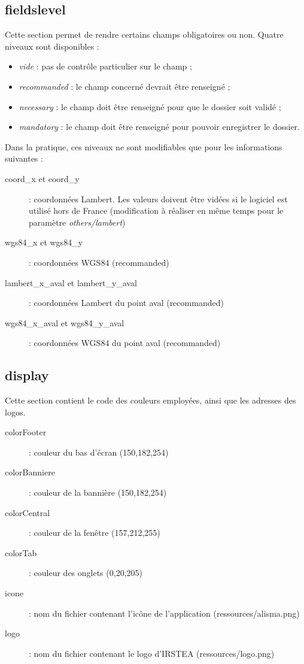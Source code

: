 \subsection{fieldslevel}
Cette section permet de rendre certains champs obligatoires ou non. Quatre niveaux sont disponibles :
\begin{itemize}
\item \textit{vide} : pas de contrôle particulier sur le champ ;
\item \textit{recommanded} : le champ concerné devrait être renseigné ;
\item \textit{necessary} : le champ doit être renseigné pour que le dossier soit validé ;
\item \textit{mandatory} : le champ doit être renseigné pour pouvoir enregistrer le dossier.
\end{itemize}

Dans la pratique, ces niveaux ne sont modifiables que pour les informations suivantes :
\begin{description}
\item [coord\_x et coord\_y] : coordonnées Lambert. Les valeurs doivent être vidées si le logiciel est utilisé hors de France (modification à réaliser en même temps pour le paramètre \textit{others/lambert}) 
\item [wgs84\_x et wgs84\_y] : coordonnées WGS84 (recommanded)
\item [lambert\_x\_aval et lambert\_y\_aval] : coordonnées Lambert du point aval (recommanded)
\item [wgs84\_x\_aval et wgs84\_y\_aval] : coordonnées WGS84 du point aval (recommanded)
\end{description}

\subsection{display}
Cette section contient le code des couleurs employées, ainsi que les adresses des logos.
\begin{description}
\item [colorFooter] : couleur du bas d'écran (150,182,254)
\item [colorBanniere] : couleur de la bannière (150,182,254)
\item [colorCentral] : couleur de la fenêtre (157,212,255)
\item [colorTab] : couleur des onglets (0,20,205)
\item [icone] : nom du fichier contenant l'icône de l'application (ressources/alisma.png)
\item [logo] : nom du fichier contenant le logo d'IRSTEA (ressources/logo.png)
\end{description}

